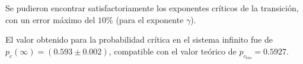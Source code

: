 \documentclass[
 reprint,
 amsmath,amssymb,
 aps,
]{revtex4-1}
\begin{document}
Se pudieron encontrar satisfactoriamente los exponentes cr\'iticos de la transici\'on, con un error m\'aximo del $10\%$ (para el exponente $\gamma$).

El valor obtenido para la probabilidad cr\'itica en el sistema infinito fue de $p_c(\infty) = (0.593\pm 0.002)$, compatible con el valor te\'orico de $p_c_\text{teo} = 0.5927$.

\appendix
\end{document}
